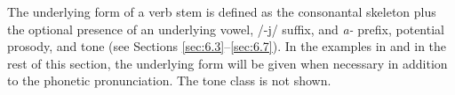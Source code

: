 The underlying form of a verb stem is defined as the consonantal skeleton plus the optional presence of an underlying vowel, /-j/ suffix, and \textit{a-} prefix, potential prosody, and tone (see Sections \ref{sec:6.3}--\ref{sec:6.7}). In the examples in  and in the rest of this section, the underlying form will be given when necessary in addition to the phonetic pronunciation. The tone class is not shown. 

\begin{table}
\end{table}
